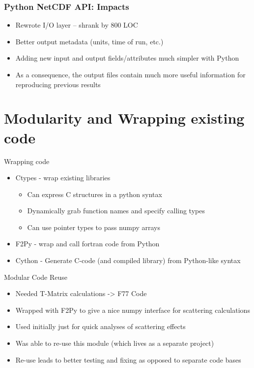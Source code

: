 \documentclass[red, hyperref={pdfpagelabels=false}]{beamer}
\begin{document}
\begin{frame}
  \frametitle{Python NetCDF API: Impacts}
  \begin{itemize}
    \item Rewrote I/O layer -- shrank by 800 LOC
    \item Better output metadata (units, time of run, etc.)
    \item Adding new input and output fields/attributes much simpler with Python
    \item As a consequence, the output files contain much more useful
      information for reproducing previous results
  \end{itemize}
\end{frame}

\section[Modularity]{Modularity and Wrapping existing code}
\begin{frame}{Wrapping code}
  \begin{itemize}
    \item<1-> \alert<4->{Ctypes} - wrap existing libraries
    \begin{itemize}
        \item Can express C structures in a python syntax
        \item Dynamically grab function names and specify calling types
        \item Can use pointer types to pass numpy arrays
    \end{itemize}
    \item<2-> \alert<4->{F2Py} - wrap and call fortran code from Python
    \item<3-> Cython - Generate C-code (and compiled library) from Python-like syntax
  \end{itemize}
\end{frame}

\begin{frame}[<+->]{Modular Code Reuse}
  \begin{itemize}
    \item Needed T-Matrix calculations -> F77 Code
    \item Wrapped with F2Py to give a nice numpy interface for scattering calculations
    \item Used initially just for quick analyses of scattering effects
    \item Was able to re-use this module (which lives as a separate project)
    \item Re-use leads to better testing and fixing as opposed to separate code bases
  \end{itemize}
\end{frame}
\end{document}
